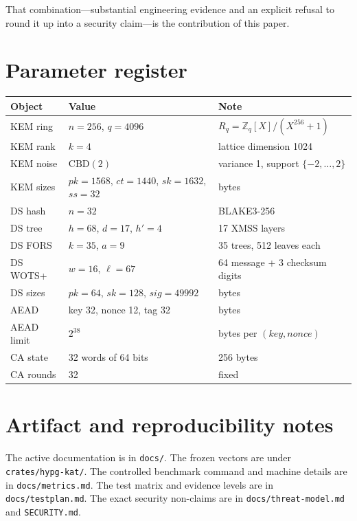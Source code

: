 \documentclass[11pt,a4paper]{article}
\theoremstyle{plain}
\theoremstyle{definition}
\theoremstyle{remark}
\newcommand{\Z}{\mathbb{Z}}
\begin{document}
That combination---substantial engineering evidence and an explicit
refusal to round it up into a security claim---is the contribution of
this paper.

\appendix

\section{Parameter register}
\label{app:params}

\begin{longtable}{@{}lll@{}}
\toprule
Object & Value & Note \\
\midrule
\endhead
KEM ring & $n=256$, $q=4096$ & $R_q=\Z_q[X]/(X^{256}+1)$ \\
KEM rank & $k=4$ & lattice dimension 1024 \\
KEM noise & $\mathrm{CBD}(2)$ & variance 1, support $\{-2,\ldots,2\}$ \\
KEM sizes & $pk=1568$, $ct=1440$, $sk=1632$, $ss=32$ & bytes \\
DS hash & $n=32$ & BLAKE3-256 \\
DS tree & $h=68$, $d=17$, $h'=4$ & 17 XMSS layers \\
DS FORS & $k=35$, $a=9$ & 35 trees, 512 leaves each \\
DS WOTS+ & $w=16$, $\ell=67$ & 64 message + 3 checksum digits \\
DS sizes & $pk=64$, $sk=128$, $sig=49992$ & bytes \\
AEAD & key 32, nonce 12, tag 32 & bytes \\
AEAD limit & $2^{38}$ & bytes per $(key,nonce)$ \\
CA state & 32 words of 64 bits & 256 bytes \\
CA rounds & 32 & fixed \\
\bottomrule
\end{longtable}

\section{Artifact and reproducibility notes}
\label{app:artifact}

The active documentation is in \texttt{docs/}.  The frozen vectors are
under \texttt{crates/hypg-kat/}.  The controlled benchmark command and
machine details are in \texttt{docs/metrics.md}.  The test matrix and
evidence levels are in \texttt{docs/testplan.md}.  The exact security
non-claims are in \texttt{docs/threat-model.md} and
\texttt{SECURITY.md}.
\end{document}
